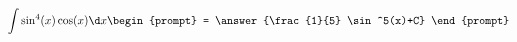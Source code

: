 \documentclass{ximera}
\author{Steven Gubkin}
\begin{document}
\begin{exercise}

\[
\int \sin^4(x)\cos(x) \d x \begin{prompt} = \answer{\frac{1}{5} \sin^5(x)+C} \end{prompt}
\]

\end{exercise}
\end{document}
